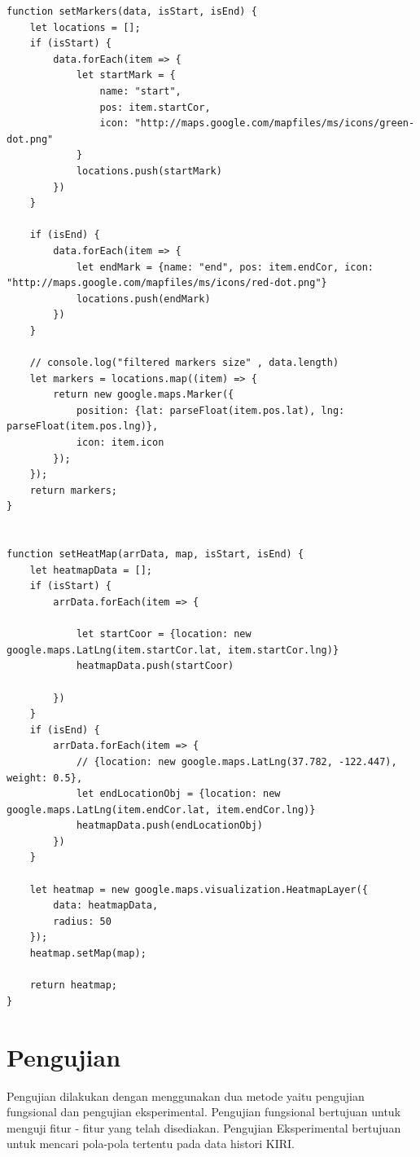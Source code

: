 \begin{lstlisting}[label=map_input , caption=Map Input]
function setMarkers(data, isStart, isEnd) {
    let locations = [];
    if (isStart) {
        data.forEach(item => {
            let startMark = {
                name: "start",
                pos: item.startCor,
                icon: "http://maps.google.com/mapfiles/ms/icons/green-dot.png"
            }
            locations.push(startMark)
        })
    }

    if (isEnd) {
        data.forEach(item => {
            let endMark = {name: "end", pos: item.endCor, icon: "http://maps.google.com/mapfiles/ms/icons/red-dot.png"}
            locations.push(endMark)
        })
    }

    // console.log("filtered markers size" , data.length)
    let markers = locations.map((item) => {
        return new google.maps.Marker({
            position: {lat: parseFloat(item.pos.lat), lng: parseFloat(item.pos.lng)},
            icon: item.icon
        });
    });
    return markers;
}


function setHeatMap(arrData, map, isStart, isEnd) {
    let heatmapData = [];
    if (isStart) {
        arrData.forEach(item => {

            let startCoor = {location: new google.maps.LatLng(item.startCor.lat, item.startCor.lng)}
            heatmapData.push(startCoor)

        })
    }
    if (isEnd) {
        arrData.forEach(item => {
            // {location: new google.maps.LatLng(37.782, -122.447), weight: 0.5},
            let endLocationObj = {location: new google.maps.LatLng(item.endCor.lat, item.endCor.lng)}
            heatmapData.push(endLocationObj)
        })
    }

    let heatmap = new google.maps.visualization.HeatmapLayer({
        data: heatmapData,
        radius: 50
    });
    heatmap.setMap(map);

    return heatmap;
}

\end{lstlisting}

\section{Pengujian}
\label{sec:pengujian}
Pengujian dilakukan dengan menggunakan dua metode yaitu pengujian fungsional dan pengujian eksperimental. Pengujian fungsional bertujuan untuk menguji fitur - fitur yang telah disediakan. Pengujian Eksperimental bertujuan untuk mencari pola-pola tertentu pada data histori KIRI.

